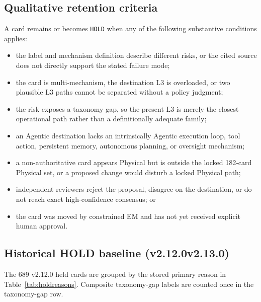 \documentclass[11pt,a4paper]{article}
\newcommand{\code}[1]{\texttt{#1}}
\begin{document}
\begin{appendices}
\subsection{Qualitative retention criteria}

A card remains or becomes \code{HOLD} when any of the following substantive
conditions applies:
\begin{itemize}[leftmargin=2em]
  \item the label and mechanism definition describe different risks, or the
  cited source does not directly support the stated failure mode;
  \item the card is multi-mechanism, the destination L3 is overloaded, or two
  plausible L3 paths cannot be separated without a policy judgment;
  \item the risk exposes a taxonomy gap, so the present L3 is merely the closest
  operational path rather than a definitionally adequate family;
  \item an Agentic destination lacks an intrinsically Agentic execution loop,
  tool action, persistent memory, autonomous planning, or oversight mechanism;
  \item a non-authoritative card appears Physical but is outside the locked
  182-card Physical set, or a proposed change would disturb a locked Physical
  path;
  \item independent reviewers reject the proposal, disagree on the destination,
  or do not reach exact high-confidence consensus; or
  \item the card was moved by constrained EM and has not yet received explicit
  human approval.
\end{itemize}

\subsection{Historical HOLD baseline (v2.12.0\textendash{}v2.13.0)}

The 689 v2.12.0 held cards are grouped by the stored primary reason in
Table~\ref{tab:holdreasons}. Composite taxonomy-gap labels are counted once in
the taxonomy-gap row.


\end{appendices}
\end{document}

